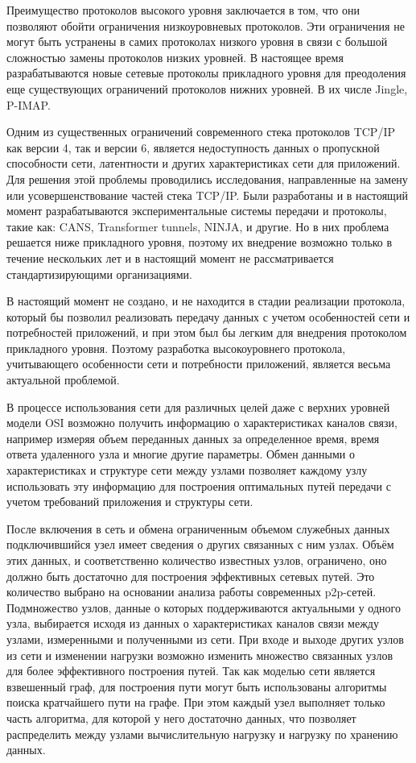 \documentclass[10pt, a5paper]{article}
\begin{document}
Преимущество протоколов высокого уровня заключается в том, что они позволяют обойти ограничения низкоуровневых протоколов. Эти ограничения не могут быть устранены в самих протоколах низкого уровня в связи с большой сложностью замены протоколов низких уровней. В настоящее время разрабатываются новые сетевые протоколы прикладного уровня для преодоления еще существующих ограничений протоколов нижних уровней. В их числе Jingle, P-IMAP.

Одним из существенных ограничений современного стека протоколов TCP/IP как версии 4, так и версии 6, является недоступность данных о пропускной способности сети, латентности и других характеристиках сети для приложений. Для решения этой проблемы проводились исследования, направленные на замену или усовершенствование частей стека TCP/IP. Были разработаны и в настоящий момент разрабатываются экспериментальные системы передачи и протоколы, такие как: CANS, Transformer tunnels, NINJA, и другие. Но в них проблема решается ниже прикладного уровня, поэтому их внедрение возможно только в течение нескольких лет и в настоящий момент не рассматривается стандартизирующими организациями.

В настоящий момент не создано, и не находится в стадии реализации протокола, который бы позволил реализовать передачу данных с учетом особенностей сети и потребностей приложений, и при этом был бы легким для внедрения протоколом прикладного уровня. Поэтому разработка высокоуровнего протокола, учитывающего особенности сети и потребности приложений, является весьма актуальной проблемой.

В процессе использования сети для различных целей даже с верхних уровней модели OSI возможно получить информацию о характеристиках каналов связи, например измеряя объем переданных данных за определенное время, время ответа удаленного узла и многие другие параметры. Обмен данными о характеристиках и структуре сети между узлами позволяет каждому узлу использовать эту информацию для построения оптимальных путей передачи с учетом требований приложения и структуры сети.

После включения в сеть и обмена ограниченным объемом служебных данных подключившийся узел имеет сведения о других связанных с ним узлах. Объём этих данных, и соответственно количество известных узлов, ограничено, оно должно быть достаточно для построения эффективных сетевых путей. Это количество выбрано на основании анализа работы современных p2p-сетей. Подмножество узлов, данные о которых поддерживаются актуальными у одного узла, выбирается исходя из данных о характеристиках каналов связи между узлами, измеренными и полученными из сети. При входе и выходе других узлов из сети и изменении нагрузки возможно изменить множество связанных узлов для более эффективного построения путей.  Так как моделью сети является взвешенный граф, для построения пути могут быть использованы алгоритмы поиска кратчайшего пути на графе. При этом каждый узел выполняет только часть алгоритма, для которой у него достаточно данных, что позволяет распределить между узлами вычислительную нагрузку и нагрузку по хранению данных.
\end{document}
